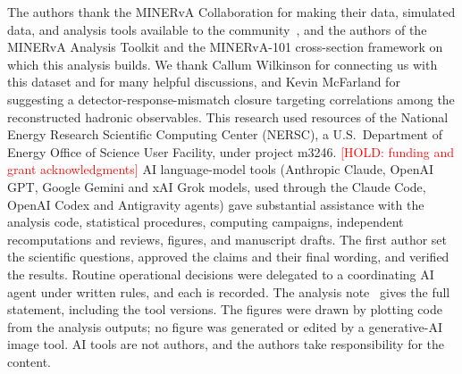 \documentclass[aps,prd,reprint,superscriptaddress,nofootinbib,floatfix,longbibliography]{revtex4-2}
\newcommand{\pubhold}[1]{\textcolor{red}{[HOLD: #1]}}
\numberwithin{equation}{section}
\begin{document}
\maketitle



\begin{acknowledgments}
The authors thank the MINERvA Collaboration for making their data, simulated data, and analysis tools available to the community~\cite{MINERvA:OpenData,MINERvA:2013zvz}, and the authors of the MINERvA Analysis Toolkit and the MINERvA-101 cross-section framework on which this analysis builds.  We thank Callum Wilkinson for connecting us with this dataset and for many helpful discussions, and Kevin McFarland for suggesting a detector-response-mismatch closure targeting correlations among the reconstructed hadronic observables.  This research used resources of the National Energy Research Scientific Computing Center (NERSC), a U.S.\ Department of Energy Office of Science User Facility, under project m3246.  \pubhold{funding and grant acknowledgments} AI language-model tools (Anthropic Claude, OpenAI GPT, Google Gemini and xAI Grok models, used through the Claude Code, OpenAI Codex and Antigravity agents) gave substantial assistance with the analysis code, statistical procedures, computing campaigns, independent recomputations and reviews, figures, and manuscript drafts. The first author set the scientific questions, approved the claims and their final wording, and verified the results. Routine operational decisions were delegated to a coordinating AI agent under written rules, and each is recorded. The analysis note~\cite{AnalysisNote2026} gives the full statement, including the tool versions. The figures were drawn by plotting code from the analysis outputs; no figure was generated or edited by a generative-AI image tool. AI tools are not authors, and the authors take responsibility for the content.

\end{acknowledgments}
\end{document}
